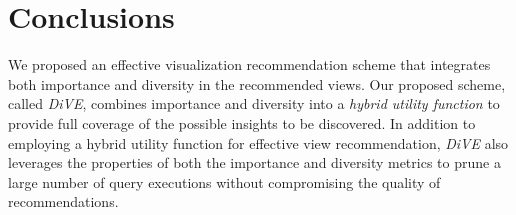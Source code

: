 
\section{Conclusions}
We proposed an effective visualization recommendation scheme that integrates both importance and diversity in the recommended views. Our proposed scheme, called {\em DiVE}, combines importance and diversity into a {\em hybrid utility function} to provide full coverage of the possible insights to be discovered. In addition to employing a hybrid utility function for effective view recommendation, {\em DiVE} also leverages the properties of both the importance and diversity metrics to prune a large number of query executions without compromising the quality of recommendations. 




%
